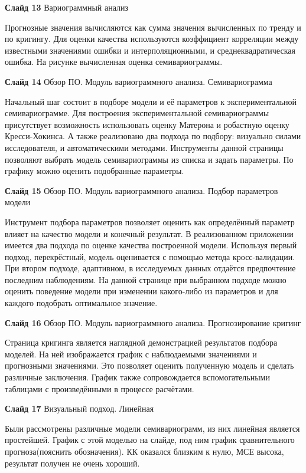 \documentclass[a4paper,10pt]{report}
\begin{document}
\textbf{Слайд 13} Вариограммный анализ

Прогнозные значения вычисляются как сумма значения вычисленных по тренду и по кригингу. Для оценки качества используются коэффициент корреляции между известными значениями ошибки и интерполяционными, и среднеквадратическая ошибка. На рисунке вычисленная оценка семивариограммы.

\textbf{Слайд 14} Обзор ПО. Модуль вариограммного анализа. Семивариограмма

Начальный шаг состоит в подборе модели и её параметров к экспериментальной семивариограмме. Для построения экспериментальной семивариограммы присутствует возможность использовать оценку Матерона и робастную оценку Кресси-Хокинса. А также реализовано два подхода по подбору: визуально силами исследователя, и автоматическими методами. Инструменты данной страницы позволяют выбрать модель семивариограммы из списка и задать параметры. По графику можно оценить подобранные параметры.

\textbf{Слайд 15} Обзор ПО. Модуль вариограммного анализа. Подбор параметров модели

Инструмент подбора параметров позволяет оценить как определённый параметр влияет на качество модели и конечный результат. В реализованном приложении имеется два подхода по оценке качества построенной модели. Используя первый подход, перекрёстный, модель оценивается с помощью метода кросс-валидации. При втором подходе, адаптивном, в исследуемых данных отдаётся предпочтение последним наблюдениям. На данной странице при выбранном подходе можно оценить поведение модели при изменении какого-либо из параметров и для каждого подобрать оптимальное значение.

\textbf{Слайд 16} Обзор ПО. Модуль вариограммного анализа. Прогнозирование кригинг

Страница кригинга является наглядной демонстрацией результатов подбора моделей. На ней изображается график с наблюдаемыми значениями и прогнозными значениями. Это позволяет оценить полученную модель и сделать различные заключения. График также сопровождается вспомогательными таблицами с произведёнными в процессе расчётами.

\textbf{Слайд 17} Визуальный подход. Линейная

Были рассмотрены различные модели семивариограмм, из них линейная является простейшей. График с этой моделью на слайде, под ним график сравнительного прогноза(пояснить обозначения). КК оказался близким к нулю, МСЕ высока, результат получен не очень хороший.
\end{document}
